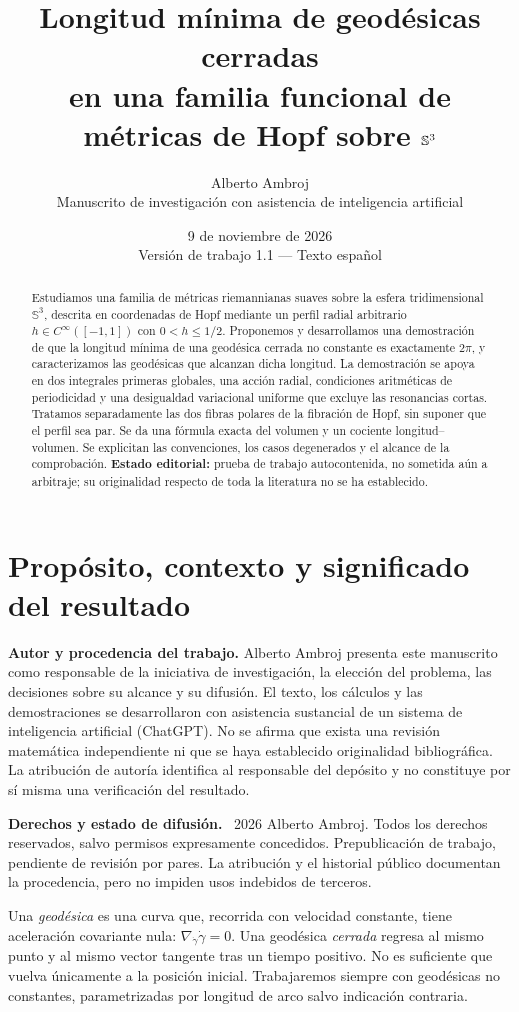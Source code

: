 \documentclass[11pt,a4paper]{article}
\title{\bfseries Longitud mínima de geodésicas cerradas\\en una familia funcional de métricas de Hopf sobre $\Sthree$}
\author{Alberto Ambroj\\\small Manuscrito de investigación con asistencia de inteligencia artificial}
\date{9 de noviembre de 2026\\\small Versión de trabajo 1.1 --- Texto español}
\theoremstyle{remark}\newtheorem{remark}[theorem]{Observación}
\newcommand{\Sthree}{\mathbb S^3}
\begin{document}
\maketitle
\begin{abstract}
Estudiamos una familia de métricas riemannianas suaves sobre la esfera tridimensional $\Sthree$, descrita en coordenadas de Hopf mediante un perfil radial arbitrario $h\in C^\infty([-1,1])$ con $0<h\leq 1/2$. Proponemos y desarrollamos una demostración de que la longitud mínima de una geodésica cerrada no constante es exactamente $2\pi$, y caracterizamos las geodésicas que alcanzan dicha longitud. La demostración se apoya en dos integrales primeras globales, una acción radial, condiciones aritméticas de periodicidad y una desigualdad variacional uniforme que excluye las resonancias cortas. Tratamos separadamente las dos fibras polares de la fibración de Hopf, sin suponer que el perfil sea par. Se da una fórmula exacta del volumen y un cociente longitud--volumen. Se explicitan las convenciones, los casos degenerados y el alcance de la comprobación. \textbf{Estado editorial:} prueba de trabajo autocontenida, no sometida aún a arbitraje; su originalidad respecto de toda la literatura no se ha establecido.
\end{abstract}
\tableofcontents
\newpage
\section{Propósito, contexto y significado del resultado}
\textbf{Autor y procedencia del trabajo.} Alberto Ambroj presenta este manuscrito como responsable de la iniciativa de investigación, la elección del problema, las decisiones sobre su alcance y su difusión. El texto, los cálculos y las demostraciones se desarrollaron con asistencia sustancial de un sistema de inteligencia artificial (ChatGPT). No se afirma que exista una revisión matemática independiente ni que se haya establecido originalidad bibliográfica. La atribución de autoría identifica al responsable del depósito y no constituye por sí misma una verificación del resultado.

\textbf{Derechos y estado de difusión.} \textcopyright\ 2026 Alberto Ambroj. Todos los derechos reservados, salvo permisos expresamente concedidos. Prepublicación de trabajo, pendiente de revisión por pares. La atribución y el historial público documentan la procedencia, pero no impiden usos indebidos de terceros.

Una \emph{geodésica} es una curva que, recorrida con velocidad constante, tiene aceleración covariante nula: $\nabla_{\dot\gamma}\dot\gamma=0$. Una geodésica \emph{cerrada} regresa al mismo punto y al mismo vector tangente tras un tiempo positivo. No es suficiente que vuelva únicamente a la posición inicial. Trabajaremos siempre con geodésicas no constantes, parametrizadas por longitud de arco salvo indicación contraria.
\end{document}
